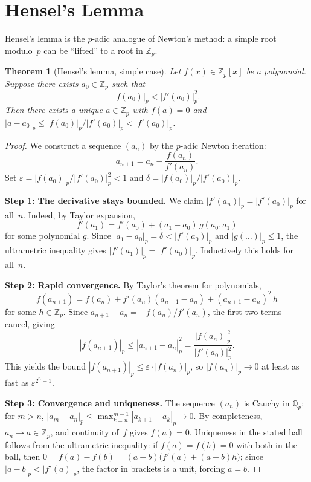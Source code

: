 \documentclass[12pt,a4paper,openany]{book}
\theoremstyle{definition}
\theoremstyle{plain}
\newtheorem{theorem}[definition]{Theorem}
\theoremstyle{remark}
\newcommand{\Z}{\mathbb{Z}}
\newcommand{\Q}{\mathbb{Q}}
\newcommand{\abs}[1]{\left|#1\right|}
\begin{document}
\section{Hensel's Lemma}
\label{sec:hensel}

Hensel's lemma is the $p$-adic analogue of Newton's method: a simple root
modulo~$p$ can be ``lifted'' to a root in $\Z_p$.

\begin{theorem}[Hensel's lemma, simple case]
\label{thm:hensel}
Let $f(x) \in \Z_p[x]$ be a polynomial. Suppose there exists $a_0 \in \Z_p$
such that
\[
  \abs{f(a_0)}_p < \abs{f'(a_0)}_p^2.
\]
Then there exists a unique $a \in \Z_p$ with $f(a) = 0$ and
$\abs{a - a_0}_p \leq \abs{f(a_0)}_p / \abs{f'(a_0)}_p < \abs{f'(a_0)}_p$.
\end{theorem}

\begin{proof}
We construct a sequence $(a_n)$ by the $p$-adic Newton iteration:
\[
  a_{n+1} = a_n - \frac{f(a_n)}{f'(a_n)}.
\]
Set $\varepsilon = \abs{f(a_0)}_p / \abs{f'(a_0)}_p^2 < 1$ and
$\delta = \abs{f(a_0)}_p / \abs{f'(a_0)}_p$.

\medskip\noindent
\textbf{Step 1: The derivative stays bounded.}
We claim $\abs{f'(a_n)}_p = \abs{f'(a_0)}_p$ for all~$n$. Indeed, by
Taylor expansion,
\[
  f'(a_1) = f'(a_0) + (a_1 - a_0)\, g(a_0, a_1)
\]
for some polynomial $g$. Since $\abs{a_1 - a_0}_p = \delta < \abs{f'(a_0)}_p$
and $\abs{g(\ldots)}_p \leq 1$, the ultrametric inequality gives
$\abs{f'(a_1)}_p = \abs{f'(a_0)}_p$. Inductively this holds for all~$n$.

\medskip\noindent
\textbf{Step 2: Rapid convergence.}
By Taylor's theorem for polynomials,
\[
  f(a_{n+1}) = f(a_n) + f'(a_n)(a_{n+1}-a_n) + (a_{n+1}-a_n)^2\, h
\]
for some $h \in \Z_p$. Since $a_{n+1} - a_n = -f(a_n)/f'(a_n)$, the first two
terms cancel, giving
\[
  \abs{f(a_{n+1})}_p \leq \abs{a_{n+1}-a_n}_p^2 = \frac{\abs{f(a_n)}_p^2}{\abs{f'(a_0)}_p^2}.
\]
This yields the bound $\abs{f(a_{n+1})}_p \leq \varepsilon \cdot \abs{f(a_n)}_p$,
so $\abs{f(a_n)}_p \to 0$ at least as fast as $\varepsilon^{2^n - 1}$.

\medskip\noindent
\textbf{Step 3: Convergence and uniqueness.}
The sequence $(a_n)$ is Cauchy in $\Q_p$: for $m > n$,
$\abs{a_m - a_n}_p \leq \max_{k=n}^{m-1}\abs{a_{k+1}-a_k}_p \to 0$.
By completeness, $a_n \to a \in \Z_p$, and continuity of~$f$ gives $f(a) = 0$.
Uniqueness in the stated ball follows from the ultrametric inequality: if
$f(a) = f(b) = 0$ with both in the ball, then
$0 = f(a) - f(b) = (a-b)\bigl(f'(a) + (a-b)h\bigr)$; since $\abs{a-b}_p < \abs{f'(a)}_p$,
the factor in brackets is a unit, forcing $a = b$.
\end{proof}
\end{document}
